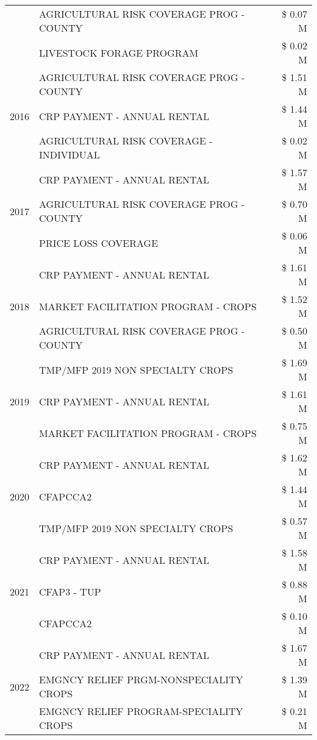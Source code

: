 \begin{tabular}{llr}
 & AGRICULTURAL RISK COVERAGE PROG - COUNTY & \$ 0.07 M \\
 & LIVESTOCK FORAGE PROGRAM & \$ 0.02 M \\
\cline{1-3}
\multirow[t]{3}{*}{2016} & AGRICULTURAL RISK COVERAGE PROG - COUNTY & \$ 1.51 M \\
 & CRP PAYMENT - ANNUAL RENTAL & \$ 1.44 M \\
 & AGRICULTURAL RISK COVERAGE - INDIVIDUAL & \$ 0.02 M \\
\cline{1-3}
\multirow[t]{3}{*}{2017} & CRP PAYMENT - ANNUAL RENTAL & \$ 1.57 M \\
 & AGRICULTURAL RISK COVERAGE PROG - COUNTY & \$ 0.70 M \\
 & PRICE LOSS COVERAGE & \$ 0.06 M \\
\cline{1-3}
\multirow[t]{3}{*}{2018} & CRP PAYMENT - ANNUAL RENTAL & \$ 1.61 M \\
 & MARKET FACILITATION PROGRAM - CROPS & \$ 1.52 M \\
 & AGRICULTURAL RISK COVERAGE PROG - COUNTY & \$ 0.50 M \\
\cline{1-3}
\multirow[t]{3}{*}{2019} & TMP/MFP 2019 NON SPECIALTY CROPS & \$ 1.69 M \\
 & CRP PAYMENT - ANNUAL RENTAL & \$ 1.61 M \\
 & MARKET FACILITATION PROGRAM - CROPS & \$ 0.75 M \\
\cline{1-3}
\multirow[t]{3}{*}{2020} & CRP PAYMENT - ANNUAL RENTAL & \$ 1.62 M \\
 & CFAPCCA2 & \$ 1.44 M \\
 & TMP/MFP 2019 NON SPECIALTY CROPS & \$ 0.57 M \\
\cline{1-3}
\multirow[t]{3}{*}{2021} & CRP PAYMENT - ANNUAL RENTAL & \$ 1.58 M \\
 & CFAP3 - TUP & \$ 0.88 M \\
 & CFAPCCA2 & \$ 0.10 M \\
\cline{1-3}
\multirow[t]{3}{*}{2022} & CRP PAYMENT - ANNUAL RENTAL & \$ 1.67 M \\
 & EMGNCY RELIEF PRGM-NONSPECIALITY CROPS & \$ 1.39 M \\
 & EMGNCY RELIEF PROGRAM-SPECIALITY CROPS & \$ 0.21 M \\
\cline{1-3}
\bottomrule
\end{tabular}
